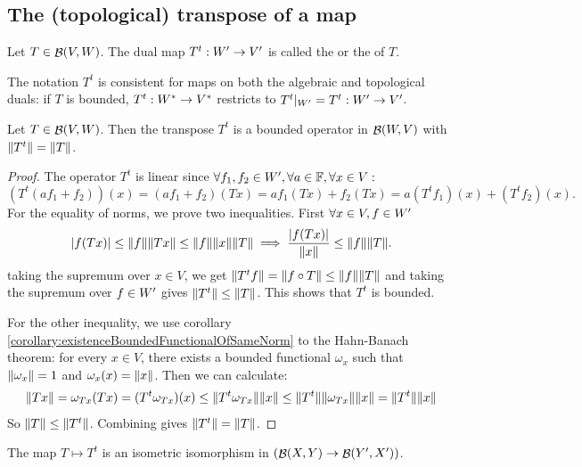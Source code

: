 \subsection{The (topological) transpose of a map}
\begin{definition}
Let $T\in\mathop{\mathcal{B}}(V,W)$. The dual map $T^t: {W}^\prime\to {V}^\prime$ is called the  or the  of $T$.
\end{definition}
The notation $T^t$ is consistent for maps on both the algebraic and topological duals: if $T$ is bounded, $T^t:{W}^*\to {V}^*$ restricts to $T^t|_{{W}^\prime} = T^t:{W}^\prime\to {V}^\prime$.

\begin{proposition}
Let $T\in\mathop{\mathcal{B}}(V,W)$. Then the transpose $T^t$ is a bounded operator in $\mathop{\mathcal{B}}(W,V)$ with $\lVert T^t\rVert = \lVert T\rVert$.
\end{proposition}
\begin{proof}
The operator $T^t$ is linear since $\forall f_1,f_2\in {W}^\prime, \forall a\in\mathbb{F}, \forall x\in V:$
\[ (T^t(af_1 + f_2))(x) = (af_1 + f_2)(Tx) = af_1(Tx) + f_2(Tx) = a(T^tf_1)(x) + (T^tf_2)(x). \]
For the equality of norms, we prove two inequalities. First $\forall x\in V, f\in {W}^\prime$
\[ |f(Tx)|\leq \lVert f\rVert\lVert Tx\rVert\leq \lVert f\rVert\lVert x\rVert\lVert T\rVert \implies \frac{|f(Tx)|}{\lVert x\rVert} \leq \lVert f\rVert\lVert T\rVert. \]
taking the supremum over $x\in V$, we get $\lVert T^tf\rVert = \lVert f\circ T\rVert\leq \lVert f\rVert\lVert T\rVert$ and taking the supremum over $f\in {W}^\prime$ gives $\lVert T^t\rVert\leq \lVert T\rVert$. This shows that $T^t$ is bounded.

For the other inequality, we use corollary \ref{corollary:existenceBoundedFunctionalOfSameNorm} to the Hahn-Banach theorem: for every $x\in V$, there exists a bounded functional $\omega_x$ such that $\lVert\omega_x\rVert=1$ and $\omega_x(x) = \lVert x\rVert$. Then we can calculate:
\begin{align*}
\lVert Tx\rVert = \omega_{Tx}(Tx) = (T^t\omega_{Tx})(x) \leq \lVert T^t\omega_{Tx}\rVert\lVert x\rVert \leq \lVert T^t\rVert\lVert\omega_{Tx}\rVert\lVert x\rVert = \lVert T^t\rVert\lVert x\rVert
\end{align*}
So $\lVert T\rVert\leq\lVert T^t\rVert$. Combining gives $\lVert T^t\rVert=\lVert T\rVert$.
\end{proof}
\begin{corollary}
The map $T\mapsto T^t$ is an isometric isomorphism in $(\mathop{\mathcal{B}}(X,Y)\to \mathop{\mathcal{B}}({Y}^\prime, {X}^\prime))$.
\end{corollary}

